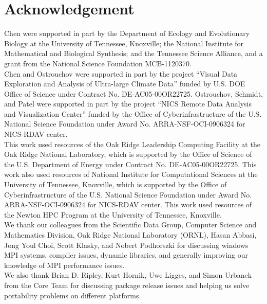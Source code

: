 
\section*{Acknowledgement}

Chen were supported in part by
the Department of Ecology and Evolutionary Biology at the
University of Tennessee, Knoxville; the National Institute for Mathematical
and Biological Synthesis; and the Tennessee Science Alliance, and a grant from
the National Science Foundation MCB-1120370.
\\

Chen and Ostrouchov were supported in part by the project
``Visual Data Exploration and Analysis of Ultra-large Climate Data''
funded by U.S. DOE Office of Science
under Contract No. DE-AC05-00OR22725.
Ostrouchov, Schmidt, and Patel were supported in part by the project
``NICS Remote Data Analysis and Visualization Center''
funded by the Office of Cyberinfrastructure of the
U.S. National Science Foundation
under Award No. ARRA-NSF-OCI-0906324 for NICS-RDAV center.
\\

This work used resources of the Oak Ridge Leadership Computing Facility at the
Oak Ridge National Laboratory, which is supported by the Office of Science
of the U.S. Department of Energy under Contract No. DE-AC05-00OR22725.
This work also used resources of National Institute for Computational
Sciences at the University of Tennessee, Knoxville, which is supported
by the Office of Cyberinfrastructure of the U.S. National Science Foundation
under Award No. ARRA-NSF-OCI-0906324 for NICS-RDAV center.
This work used resources of the Newton HPC Program at the University of
Tennessee, Knoxville.
\\

We thank our colleagues from the Scientific Data Group, Computer
Science and Mathematics Division, Oak Ridge National Laboratory
(ORNL), Hasan Abbasi, Jong Youl Choi, Scott Klasky, and Nobert
Podhorszki for discussing windows MPI systems, compiler issues,
dynamic libraries, and generally improving our knowledge of MPI
performance issues.
\\

We also thank Brian D. Ripley, Kurt Hornik, Uwe Ligges, and Simon Urbanek
from the  Core Team for discussing package release issues and
helping us solve portability problems on different platforms.
\\
